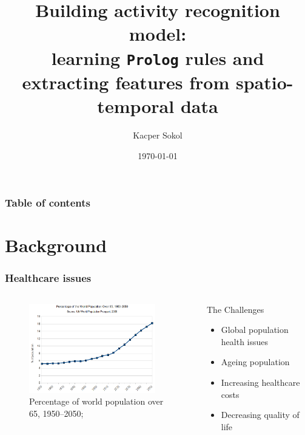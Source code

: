 \documentclass[10pt]{beamer}
\begin{document}
\author{Kacper Sokol}
\title[Building activity recognition model]{Building activity recognition model:\\learning \texttt{Prolog} rules and extracting features from spatio-temporal data}
\date{\today}

\begin{frame}[plain]
\titlepage
\end{frame}

\begin{frame}[plain]
  \frametitle{Table of contents}
  \tableofcontents
\end{frame} 


\section{Background}

  \begin{frame}
    \frametitle{Healthcare issues}
    \begin{columns}
      \begin{column}{6cm}
        \begin{figure}
          \centering
          \includegraphics[width=5.5cm]{../bgSlides/gfx/populationOver65}
          \caption{Percentage of world population over 65, 1950--2050; \cite{populationAgeing}}
        \end{figure}
      \end{column}

      \begin{column}{6cm}
        \begin{block}{The Challenges}
        \begin{itemize}
          \item Global population health issues
          \item Ageing population
          \item Increasing healthcare costs
          \item Decreasing quality of life
        \end{itemize}
        \end{block}
      \end{column}

    \end{columns}

  \end{frame}
\end{document}
